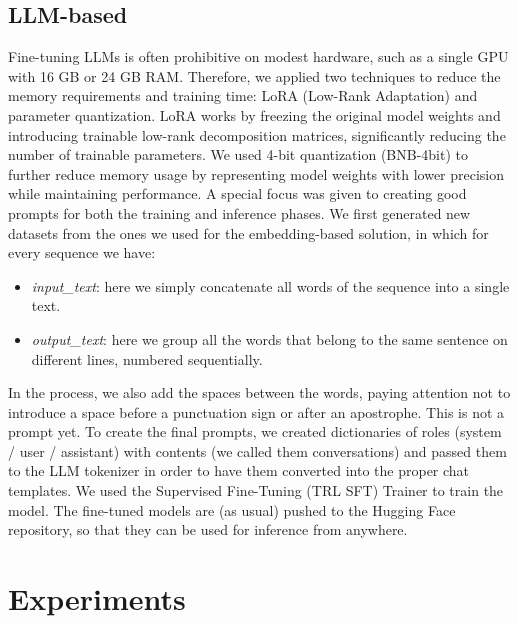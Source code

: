 \documentclass[11pt]{article}
\begin{document}
\subsection{LLM-based}
Fine-tuning LLMs is often prohibitive on modest hardware, such as a single GPU with 16 GB or 24 GB RAM. Therefore, we applied two techniques to reduce the memory requirements and training time: LoRA (Low-Rank Adaptation) and parameter quantization. \newline LoRA works by freezing the original model weights and introducing trainable low-rank decomposition matrices, significantly reducing the number of trainable parameters. We used 4-bit quantization (BNB-4bit) to further reduce memory usage by representing model weights with lower precision while maintaining performance. \newline A special focus was given to creating good prompts for both the training and inference phases. \newline We first generated new datasets from the ones we used for the embedding-based solution, in which for every sequence we have:
 \begin{itemize}
 	\item \emph{input\_text}: here we simply concatenate all words of the sequence into a single text.
 	\item \emph{output\_text}: here we group all the words that belong to the same sentence on different lines, numbered sequentially.
 \end{itemize}
 In the process, we also add the spaces between the words, paying attention not to introduce a space before a punctuation sign or after an apostrophe. \newline This is not a prompt yet. To create the final prompts, we created dictionaries of roles (system / user / assistant) with contents (we called them conversations) and passed them to the LLM tokenizer in order to have them converted into the proper chat templates. \newline We used the Supervised Fine-Tuning (TRL SFT) Trainer to train the model. \newline The fine-tuned models are (as usual) pushed to the Hugging Face repository, so that they can be used for inference from anywhere.

\section{Experiments}
\end{document}
